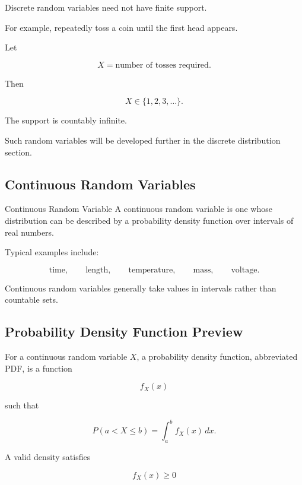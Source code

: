 Discrete random variables need not have finite support.

For example, repeatedly toss a coin until the first head appears.

Let

\[
X
=
\text{number of tosses required}.
\]

Then

\[
\boxed{
X\in\{1,2,3,\ldots\}.
}
\]

The support is countably infinite.

Such random variables will be developed further in the discrete
distribution section.

\subsection{Continuous Random Variables}
\label{subsec:continuous-random-variables}

\begin{definitionbox}{Continuous Random Variable}
A continuous random variable is one whose distribution can be described
by a probability density function over intervals of real numbers.
\end{definitionbox}

Typical examples include:

\[
\text{time},
\qquad
\text{length},
\qquad
\text{temperature},
\qquad
\text{mass},
\qquad
\text{voltage}.
\]

Continuous random variables generally take values in intervals rather
than countable sets.

\subsection{Probability Density Function Preview}
\label{subsec:pdf-preview}

For a continuous random variable \(X\), a probability density function,
abbreviated PDF, is a function

\[
f_X(x)
\]

such that

\[
\boxed{
P(a<X\leq b)
=
\int_a^b f_X(x)\,dx.
}
\]

A valid density satisfies

\[
\boxed{
f_X(x)\geq0
}
\]

